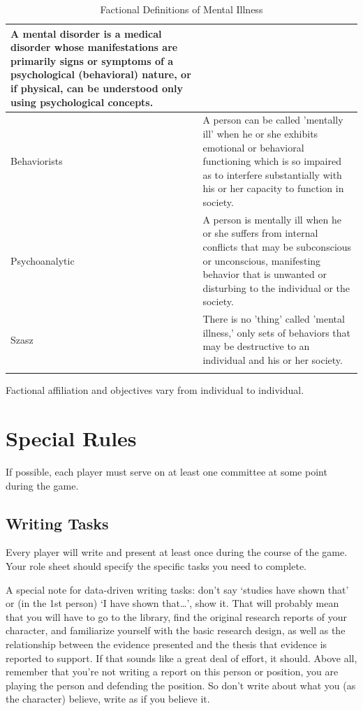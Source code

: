 \begin{refsection}
\begin{longtable}[!t]{ | p{2cm} | p{12cm} | }
A mental disorder is a medical disorder whose manifestations are primarily signs or symptoms of a psychological (behavioral) nature, or if physical, can be understood only using psychological concepts.\\ \hline
Behaviorists& A person can be called 'mentally ill' when he or she exhibits emotional or behavioral functioning which is so impaired as to interfere substantially with his or her capacity to function in society. \\ \hline
Psychoanalytic&A person is mentally ill when he or she suffers from internal conflicts that may be subconscious or unconscious, manifesting behavior that is unwanted or disturbing to the individual or the society. \\ \hline
Szasz&There is no 'thing' called 'mental illness,' only  sets of behaviors that may be destructive to an individual and his or her society. \\ \hline
 
\caption{Factional Definitions of Mental Illness}
\label{table: definitions}
\end{longtable}

Factional affiliation and objectives vary from individual to individual.

\section{Special Rules}
\label{specialrules}

If possible, each player must serve on at least one committee at some point during the game.

\subsection{Writing Tasks}
\label{writingtasks}

Every player will write and present at least once during the course of the game. Your role sheet should specify the specific tasks you need to complete.

A special note for data-driven writing tasks: don't say `studies have shown that' or (in the 1st person) `I have shown that{\ldots}', show it. That will probably mean that you will have to go to the library, find the original research reports of your character, and familiarize yourself with the basic research design, as well as the relationship between the evidence presented and the thesis that evidence is reported to support. If that sounds like a great deal of effort, it should. Above all, remember that you're not writing a report on this person or position, you are playing the person and defending the position. So don't write about what you (as the character) believe, write as if you believe it.


\end{refsection}
